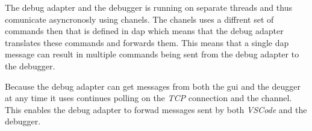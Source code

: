 The debug adapter and the debugger is running on separate threads and thus comunicate asyncronosly using chanels.
The chanels uses a diffrent set of commands then that is defined in \acrshort{dap} which means that the debug adapter translates these commands and forwards them.
This means that a single \acrshort{dap} message can result in multiple commands being sent from the debug adapter to the debugger.


Because the debug adapter can get messages from both the \acrshort{gui} and the deugger at any time it uses continues polling on the \emph{TCP} connection and the channel.
This enables the debug adapter to forwad messages sent by both \emph{VSCode} and the debugger.

